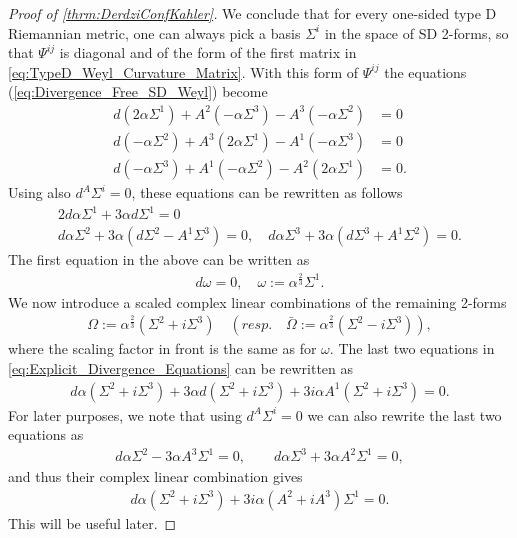 \documentclass[10pt]{report}
\theoremstyle{definition}
\begin{document}
\begin{proof}[Proof of \cref{thrm:DerdziConfKahler}]
    We conclude that for every one-sided type D Riemannian metric, one can always pick a basis $\Sigma^i$ in the space of SD 2-forms, so that $\Psi^{ij}$ is diagonal and of the form of the first matrix in \cref{eq:TypeD_Weyl_Curvature_Matrix}. With this form of $\Psi^{ij}$ the equations (\ref{eq:Divergence_Free_SD_Weyl}) become
    \begin{align}
        d\left( 2\alpha \Sigma^1 \right) + A^2 \left( -\alpha \Sigma^3 \right) - A^3 \left( -\alpha \Sigma^2 \right) &= 0 \nonumber\\
        d\left( -\alpha \Sigma^2 \right) + A^3 \left( 2\alpha \Sigma^1 \right) - A^1 \left( -\alpha \Sigma^3 \right) &= 0 \label{eq:Explicit_Divergence_Equations}\\
        d\left( -\alpha \Sigma^3 \right) + A^1 \left( -\alpha \Sigma^2 \right) - A^2 \left( 2\alpha \Sigma^1 \right) &= 0. \nonumber
    \end{align}
    Using also $d^A \Sigma^i = 0$, these equations can be rewritten as follows 
    \begin{gather}
        2 d\alpha \Sigma^1 + 3\alpha d\Sigma^1 = 0\\
        d\alpha \Sigma^2 + 3\alpha (d\Sigma^2 - A^1 \Sigma^3) = 0, \quad d\alpha \Sigma^3 + 3\alpha (d\Sigma^3 + A^1 \Sigma^2) = 0. \label{eq:dSigma_Equations_123}
    \end{gather}
    The first equation in the above can be written as 
    \begin{align}
        d\omega = 0, \quad \omega:= \alpha^\frac{2}{3} \Sigma^1 \label{eq:ConfKahler_Closed_2form_Equation}.
    \end{align}
    We now introduce a scaled complex linear combinations of the remaining 2-forms
    \begin{align}
        \Omega := \alpha^\frac{2}{3} (\Sigma^2 + i \Sigma^3) \quad (resp. \quad \bar{\Omega} := \alpha^{\frac{2}{3}} (\Sigma^2 - i\Sigma^3)),
    \end{align}
    where the scaling factor in front is the same as for $\omega$. The last two equations in \cref{eq:Explicit_Divergence_Equations} can be rewritten as
    \begin{align}\label{d-Sigma-23}
    d\alpha (\Sigma^2+i \Sigma^3) + 3\alpha d(\Sigma^2+i \Sigma^3) + 3i \alpha A^1 (\Sigma^2+i \Sigma^3)=0.
    \end{align}
    For later purposes, we note that using $d^A \Sigma^i=0$ we can also rewrite the last two equations as
    \begin{align}
    d\alpha \Sigma^2 - 3\alpha A^3\Sigma^1=0, \qquad  d\alpha \Sigma^3 + 3\alpha A^2\Sigma^1=0,
   \end{align}
    and thus their complex linear combination gives
    \begin{align}\label{d-Omega-Sigma-1}
    d\alpha (\Sigma^2+i \Sigma^3) + 3i \alpha (A^2+i A^3) \Sigma^1=0.
    \end{align}
    This will be useful later. 
    

\end{proof}
\end{document}
